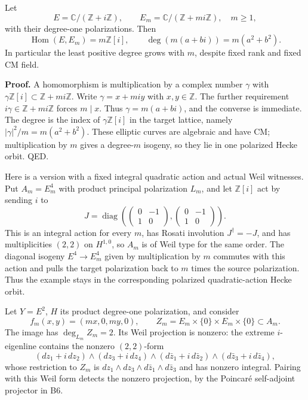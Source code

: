 Let \[
 E=\mathbb C/(\mathbb Z+i\mathbb Z),\qquad
 E_m=\mathbb C/(\mathbb Z+mi\mathbb Z),\quad m\ge1,
\] with their degree-one polarizations. Then \[
 \operatorname{Hom}(E,E_m)=m\mathbb Z[i],\qquad
 \deg(m(a+bi))=m(a^2+b^2).
\tag{B11.1}
\] In particular the least positive degree grows with \(m\), despite fixed rank and fixed CM field.

\textbf{Proof.} A homomorphism is multiplication by a complex number \(\gamma\) with \(\gamma\mathbb Z[i]\subset\mathbb Z+mi\mathbb Z\). Write \(\gamma=x+mi y\) with \(x,y\in\mathbb Z\). The further requirement \(i\gamma\in\mathbb Z+mi\mathbb Z\) forces \(m\mid x\). Thus \(\gamma=m(a+bi)\), and the converse is immediate. The degree is the index of \(\gamma\mathbb Z[i]\) in the target lattice, namely \(|\gamma|^2/m=m(a^2+b^2)\). These elliptic curves are algebraic and have CM; multiplication by \(m\) gives a degree-\(m\) isogeny, so they lie in one polarized Hecke orbit. QED.

Here is a version with a fixed integral quadratic action and actual Weil witnesses. Put \(A_m=E_m^4\) with product principal polarization \(L_m\), and let \(\mathbb Z[i]\) act by sending \(i\) to \[
 J=\operatorname{diag}\left(
 \begin{pmatrix}0&-1\\1&0\end{pmatrix},
 \begin{pmatrix}0&-1\\1&0\end{pmatrix}\right).
\] This is an integral action for every \(m\), has Rosati involution \(J^\dagger=-J\), and has multiplicities \((2,2)\) on \(H^{1,0}\), so \(A_m\) is of Weil type for the same order. The diagonal isogeny \(E^4\to E_m^4\) given by multiplication by \(m\) commutes with this action and pulls the target polarization back to \(m\) times the source polarization. Thus the example stays in the corresponding polarized quadratic-action Hecke orbit.

Let \(Y=E^2\), \(H\) its product degree-one polarization, and consider \[
 f_m(x,y)=(mx,0,my,0),\qquad
 Z_m=E_m\times\{0\}\times E_m\times\{0\}\subset A_m.
\] The image has \(\deg_{L_m}Z_m=2\). Its Weil projection is nonzero: the extreme \(i\)-eigenline contains the nonzero \((2,2)\)-form \[
 (dz_1+i\,dz_2)\wedge(dz_3+i\,dz_4)
 \wedge(d\bar z_1+i\,d\bar z_2)
 \wedge(d\bar z_3+i\,d\bar z_4),
\] whose restriction to \(Z_m\) is \(dz_1\wedge dz_3\wedge d\bar z_1\wedge d\bar z_3\) and has nonzero integral. Pairing with this Weil form detects the nonzero projection, by the Poincaré self-adjoint projector in B6.

